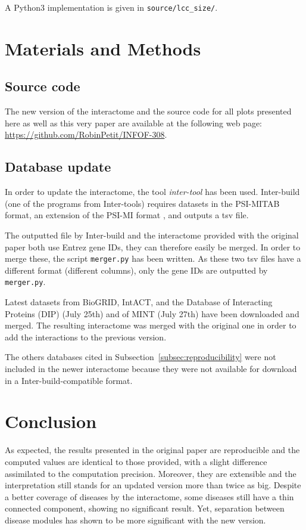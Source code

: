 \documentclass[letterpaper]{article}
\begin{document}
A Python3 implementation is given in \texttt{source/lcc\_size/}.

\section{Materials and Methods}
	\subsection{Source code}
	The new version of the interactome and the source code for all plots presented here as well as this
	very paper are available at the following web page: \url{https://github.com/RobinPetit/INFOF-308}.

	\subsection{Database update}
	In order to update the interactome, the tool \textit{inter-tool} \citep{inter-tools} has been used.
	Inter-build (one of the programs from Inter-tools) requires datasets in the PSI-MITAB format, an extension of the
	PSI-MI format \citep{MITABFormat}, and outputs a tsv file.

	The outputted file by Inter-build and the interactome provided with the original paper both use Entrez
	gene IDs, they can therefore easily be merged. In order to merge these, the script \texttt{merger.py}
	has been written. As these two tsv files have a different format (different columns), only the gene IDs
	are outputted by \texttt{merger.py}.

	Latest datasets from BioGRID, IntACT, and the Database of Interacting Proteins (DIP) \citep{salwinski2004DIP}
	(July 25th) and of MINT (July 27th) have been downloaded and merged. The resulting interactome was merged with
	the original one in order to add the interactions to the previous version.

	The others databases cited in Subsection~\ref{subsec:reproducibility} were not included in the newer
	interactome because they were not available for download in a Inter-build-compatible format.

\section{Conclusion}
As expected, the results presented in the original paper are reproducible and the computed values are
identical to those provided, with a slight difference assimilated to the computation precision.
Moreover, they are extensible and the interpretation still stands for an updated version more than
twice as big. Despite a better coverage of diseases by the interactome, some diseases still have a
thin connected component, showing no significant result. Yet, separation between disease modules has
shown to be more significant with the new version.
\end{document}
